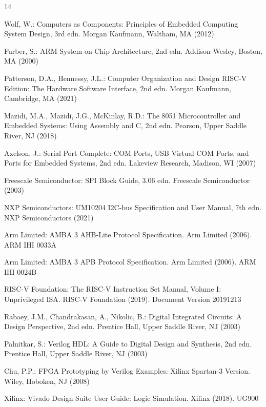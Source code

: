 \documentclass[runningheads]{llncs}
\begin{document}
\begin{thebibliography}{14}

Wolf, W.: Computers as Components: Principles of Embedded Computing System Design, 3rd edn. Morgan Kaufmann, Waltham, MA (2012)

Furber, S.: ARM System-on-Chip Architecture, 2nd edn. Addison-Wesley, Boston, MA (2000)

Patterson, D.A., Hennessy, J.L.: Computer Organization and Design RISC-V Edition: The Hardware Software Interface, 2nd edn. Morgan Kaufmann, Cambridge, MA (2021)

Mazidi, M.A., Mazidi, J.G., McKinlay, R.D.: The 8051 Microcontroller and Embedded Systems: Using Assembly and C, 2nd edn. Pearson, Upper Saddle River, NJ (2018)

Axelson, J.: Serial Port Complete: COM Ports, USB Virtual COM Ports, and Ports for Embedded Systems, 2nd edn. Lakeview Research, Madison, WI (2007)

Freescale Semiconductor: SPI Block Guide, 3.06 edn. Freescale Semiconductor (2003)

NXP Semiconductors: UM10204 I2C-bus Specification and User Manual, 7th edn. NXP Semiconductors (2021)

Arm Limited: AMBA 3 AHB-Lite Protocol Specification. Arm Limited (2006). ARM IHI 0033A

Arm Limited: AMBA 3 APB Protocol Specification. Arm Limited (2006). ARM IHI 0024B

RISC-V Foundation: The RISC-V Instruction Set Manual, Volume I: Unprivileged ISA. RISC-V Foundation (2019). Document Version 20191213

Rabaey, J.M., Chandrakasan, A., Nikolic, B.: Digital Integrated Circuits: A Design Perspective, 2nd edn. Prentice Hall, Upper Saddle River, NJ (2003)

Palnitkar, S.: Verilog HDL: A Guide to Digital Design and Synthesis, 2nd edn. Prentice Hall, Upper Saddle River, NJ (2003)

Chu, P.P.: FPGA Prototyping by Verilog Examples: Xilinx Spartan-3 Version. Wiley, Hoboken, NJ (2008)

Xilinx: Vivado Design Suite User Guide: Logic Simulation. Xilinx (2018). UG900

\end{thebibliography}
\end{document}

